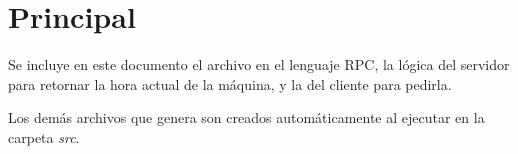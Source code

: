 \section{Principal}

Se incluye en este documento el archivo en el lenguaje RPC, la lógica del
servidor para retornar la hora actual de la máquina, y la del cliente para
pedirla.

Los demás archivos que genera  son creados automáticamente al
ejecutar  en la carpeta \emph{src}.





